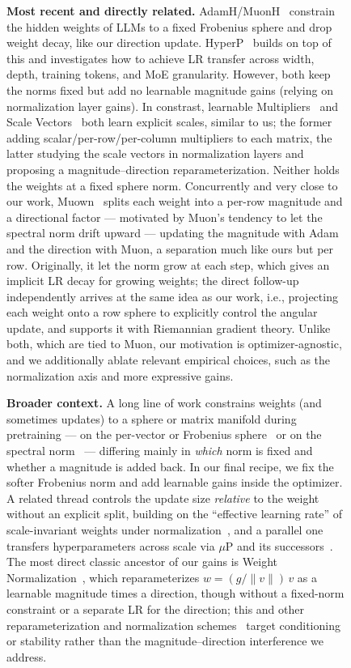 \documentclass[10pt]{article} %
\begin{document}
\begin{figure}[t]
\textbf{Most recent and directly related.} AdamH/MuonH~\citep{muonh2026} constrain the hidden weights of LLMs to a fixed Frobenius sphere and drop weight decay, like our direction update. HyperP~\citep{ren2026rethinking} builds on top of this and investigates how to achieve LR transfer across width, depth, training tokens, and MoE granularity. However, both keep the norms fixed but add no learnable magnitude gains (relying on normalization layer gains). In constrast, learnable Multipliers~\citep{velikanov2026learnable} and Scale Vectors~\citep{wang2026negligible} both learn explicit scales, similar to us; the former adding scalar/per-row/per-column multipliers to each matrix, the latter studying the scale vectors in normalization layers and proposing a magnitude--direction reparameterization. Neither holds the weights at a fixed sphere norm.
Concurrently and very close to our work, Muown~\citep{lion2026muown} splits each weight into a per-row magnitude and a directional factor --- motivated by Muon's tendency to let the spectral norm drift upward --- updating the magnitude with Adam and the direction with Muon, a separation much like ours but per row. Originally, it let the norm grow at each step, which gives an implicit LR decay for growing weights; the direct follow-up~\citep{huebler2026angularmuown} independently arrives at the same idea as our work, i.e., projecting each weight onto a row sphere to explicitly control the angular update, and supports it with Riemannian gradient theory. Unlike both, which are tied to Muon, our motivation is optimizer-agnostic, and we additionally ablate relevant empirical choices, such as the normalization axis and more expressive gains.

\textbf{Broader context.} A long line of work constrains weights (and sometimes updates) to a sphere or matrix manifold during pretraining --- on the per-vector or Frobenius sphere~\citep{loshchilov2024ngpt,franke2025learning,fu2025nemotron,gu2026mano} or on the spectral norm~\citep{xie2026controlled,bernstein2025modular,newhouse2025training,xu2026width} --- differing mainly in \emph{which} norm is fixed and whether a magnitude is added back. In our final recipe, we fix the softer Frobenius norm and add learnable gains inside the optimizer. A related thread controls the update size \emph{relative} to the weight without an explicit split, building on the ``effective learning rate'' of scale-invariant weights under normalization~\citep{vanlaarhoven2017l2,wan2021spherical,kodryan2022training,kosson2023rotational,liu2021learning,you2017large,karras2023analyzing}, and a parallel one transfers hyperparameters across scale via $\mu$P and its successors~\citep{yang2022tensor,shigida2026learning,mlodozeniec2025completed,dey2025completep}. 
The most direct classic ancestor of our gains is Weight Normalization~\citep{salimans2016weight}, which reparameterizes $w=(g/\lVert v\rVert)\,v$ as a learnable magnitude times a direction, though without a fixed-norm constraint or a separate LR for the direction; this and other reparameterization and normalization schemes~\citep{liu2018decoupled,qiao2019micro,miyato2018spectral} target conditioning or stability rather than the magnitude--direction interference we address.


\end{figure}
\end{document}
